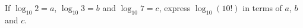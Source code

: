 If $\log_{10}2=a$, $\log_{10}3=b$ and $\log_{10}7=c$, express $\log_{10}(10!)$ in terms of $a$, $b$ and $c$.

